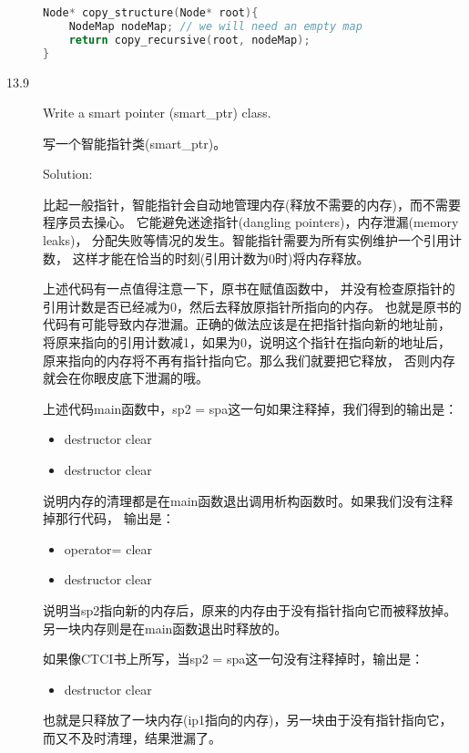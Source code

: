 \begin{description}
\begin{lstlisting}[language=C++]
Node* copy_structure(Node* root){
    NodeMap nodeMap; // we will need an empty map
    return copy_recursive(root, nodeMap);
}
\end{lstlisting}


\item[13.9] Write a smart pointer (smart\_ptr) class.

写一个智能指针类(smart\_ptr)。

Solution: 

比起一般指针，智能指针会自动地管理内存(释放不需要的内存)，而不需要程序员去操心。 它能避免迷途指针(dangling pointers)，内存泄漏(memory leaks)， 分配失败等情况的发生。智能指针需要为所有实例维护一个引用计数， 这样才能在恰当的时刻(引用计数为0时)将内存释放。

上述代码有一点值得注意一下，原书在赋值函数中， 并没有检查原指针的引用计数是否已经减为0，然后去释放原指针所指向的内存。 也就是原书的代码有可能导致内存泄漏。正确的做法应该是在把指针指向新的地址前， 将原来指向的引用计数减1，如果为0，说明这个指针在指向新的地址后， 原来指向的内存将不再有指针指向它。那么我们就要把它释放， 否则内存就会在你眼皮底下泄漏的哦。

上述代码main函数中，sp2 = spa这一句如果注释掉，我们得到的输出是：
\begin{itemize}
  \itemsep=-3pt
\item destructor clear
\item destructor clear
\end{itemize}
说明内存的清理都是在main函数退出调用析构函数时。如果我们没有注释掉那行代码， 输出是：
\begin{itemize}
  \itemsep=-3pt
\item operator= clear
\item destructor clear
\end{itemize}
说明当sp2指向新的内存后，原来的内存由于没有指针指向它而被释放掉。 另一块内存则是在main函数退出时释放的。

如果像CTCI书上所写，当sp2 = spa这一句没有注释掉时，输出是：
\begin{itemize}
  \itemsep=-3pt
\item destructor clear
\end{itemize}

也就是只释放了一块内存(ip1指向的内存)，另一块由于没有指针指向它， 而又不及时清理，结果泄漏了。


\end{description}
